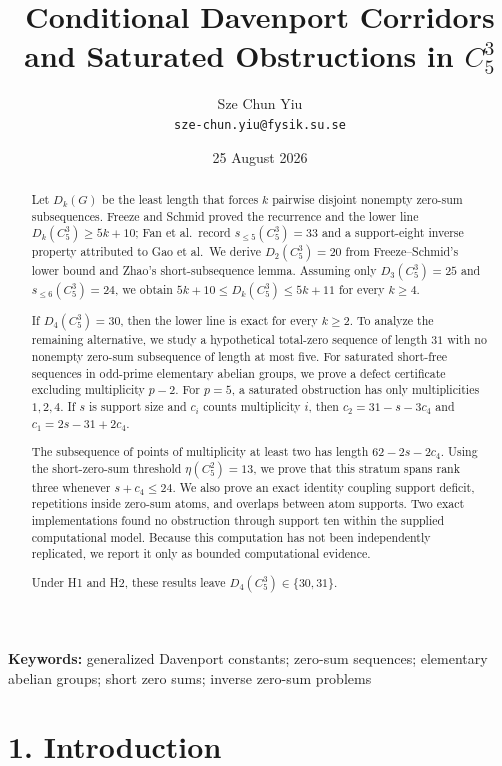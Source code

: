\documentclass[
  11pt,
]{article}
\title{Conditional Davenport Corridors and Saturated Obstructions in \(C_5^3\)}
\author{Sze Chun Yiu\\\texttt{sze-chun.yiu@fysik.su.se}}
\date{25 August 2026}
\begin{document}
\maketitle

\begin{abstract}
Let \(D_k(G)\) be the least length that forces \(k\) pairwise disjoint
nonempty zero-sum subsequences. Freeze and Schmid proved the recurrence
and the lower line \(D_k(C_5^3)\ge5k+10\); Fan et al.~record
\(s_{\le5}(C_5^3)=33\) and a support-eight inverse property attributed
to Gao et al.~We derive \(D_2(C_5^3)=20\) from Freeze--Schmid's lower
bound and Zhao's short-subsequence lemma. Assuming only
\(D_3(C_5^3)=25\) and \(s_{\le6}(C_5^3)=24\), we obtain
\(5k+10\le D_k(C_5^3)\le5k+11\) for every \(k\ge4\).

If \(D_4(C_5^3)=30\), then the lower line is exact for every \(k\ge2\).
To analyze the remaining alternative, we study a hypothetical total-zero
sequence of length \(31\) with no nonempty zero-sum subsequence of
length at most five. For saturated short-free sequences in odd-prime
elementary abelian groups, we prove a defect certificate excluding
multiplicity \(p-2\). For \(p=5\), a saturated obstruction has only
multiplicities \(1,2,4\). If \(s\) is support size and \(c_i\) counts
multiplicity \(i\), then \(c_2=31-s-3c_4\) and \(c_1=2s-31+2c_4\).

The subsequence of points of multiplicity at least two has length
\(62-2s-2c_4\). Using the short-zero-sum threshold \(\eta(C_5^2)=13\),
we prove that this stratum spans rank three whenever \(s+c_4\le24\). We
also prove an exact identity coupling support deficit, repetitions
inside zero-sum atoms, and overlaps between atom supports. Two exact
implementations found no obstruction through support ten within the
supplied computational model. Because this computation has not been
independently replicated, we report it only as bounded computational
evidence.

Under H1 and H2, these results leave \(D_4(C_5^3)\in\{30,31\}\).

\end{abstract}

\noindent\textbf{Keywords:} generalized Davenport constants; zero-sum sequences;
elementary abelian groups; short zero sums; inverse zero-sum problems

\hypertarget{introduction}{%
\section{1. Introduction}\label{introduction}}
\end{document}
